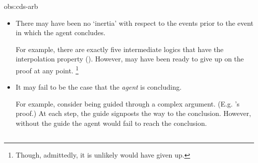 \begin{note}
\begin{argument}{obs:cds-arb}
\begin{itemize}[leftmargin=*]
    \item
      There may have been no `inertia' with respect to the events prior to the event in which the agent concludes.

    For example, there are exactly five intermediate logics that have the interpolation property (\cite[cf.][]{Maksimova:1977un}).
    However, \citeauthor{Maksimova:1977un} may have been ready to give up on the proof at any point.%
    \footnote{%
      Though, admittedly, it is unlikely \citeauthor{Maksimova:1977un} would have given up.
    }
  \item
    It may fail to be the case that the \emph{agent} is concluding.

    For example, consider being guided through a complex argument.
    (E.g. \citeauthor{Maksimova:1977un}'s proof.)
    At each step, the guide signposts the way to the conclusion.
    However, without the guide the agent would fail to reach the conclusion.
  \end{itemize}
  \vspace{-\baselineskip}
  \end{argument}
\end{note}

\subsection{}
\label{sec:assupp2}

